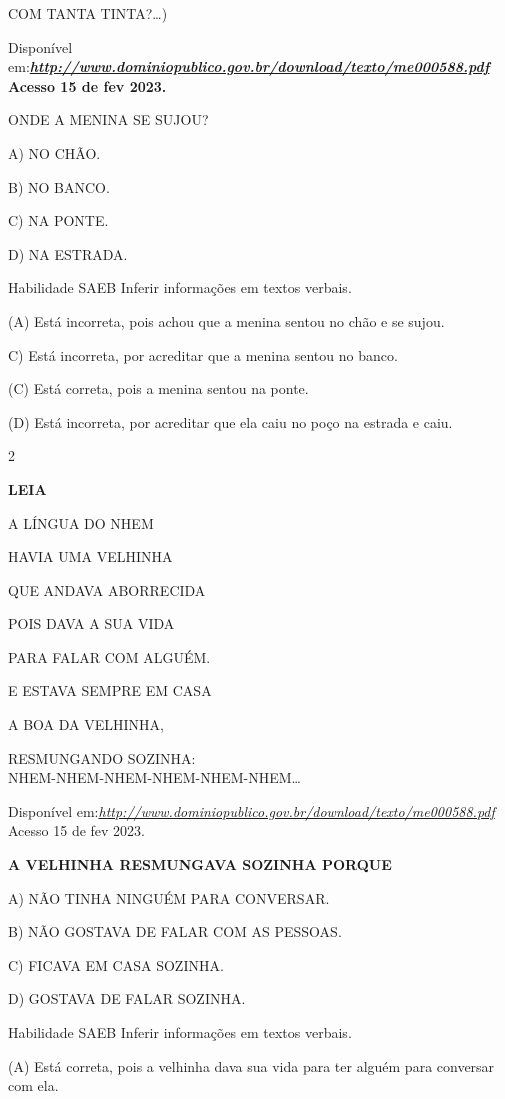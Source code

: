 \begin{escola}
COM TANTA TINTA?\ldots{})

Disponível
em:\textbf{\href{http://www.dominiopublico.gov.br/download/texto/me000588.pdf}{\emph{http://www.dominiopublico.gov.br/download/texto/me000588.pdf}}
Acesso 15 de fev 2023.}

ONDE A MENINA SE SUJOU?

A) NO CHÃO.

B) NO BANCO.

C) NA PONTE.

D) NA ESTRADA.

\protect\hypertarget{_heading=h.49x2ik5}{}{}Habilidade SAEB Inferir
informações em textos verbais.

(A) Está incorreta, pois achou que a menina sentou no chão e se sujou.

C) Está incorreta, por acreditar que a menina sentou no banco.

(C) Está correta, pois a menina sentou na ponte.

(D) Está incorreta, por acreditar que ela caiu no poço na estrada e
caiu.

\num{2}

\textbf{LEIA}

A LÍNGUA DO NHEM

HAVIA UMA VELHINHA

QUE ANDAVA ABORRECIDA

POIS DAVA A SUA VIDA

PARA FALAR COM ALGUÉM.

E ESTAVA SEMPRE EM CASA

A BOA DA VELHINHA,

RESMUNGANDO SOZINHA:\\
NHEM-NHEM-NHEM-NHEM-NHEM-NHEM\ldots{}

Disponível
em:\href{http://www.dominiopublico.gov.br/download/texto/me000588.pdf}{\emph{http://www.dominiopublico.gov.br/download/texto/me000588.pdf}}
Acesso 15 de fev 2023.

\textbf{A VELHINHA RESMUNGAVA SOZINHA PORQUE}

A) NÃO TINHA NINGUÉM PARA CONVERSAR.

B) NÃO GOSTAVA DE FALAR COM AS PESSOAS.

C) FICAVA EM CASA SOZINHA.

D) GOSTAVA DE FALAR SOZINHA.

Habilidade SAEB Inferir informações em textos verbais.

(A) Está correta, pois a velhinha dava sua vida para ter alguém para
conversar com ela.


\end{escola}
